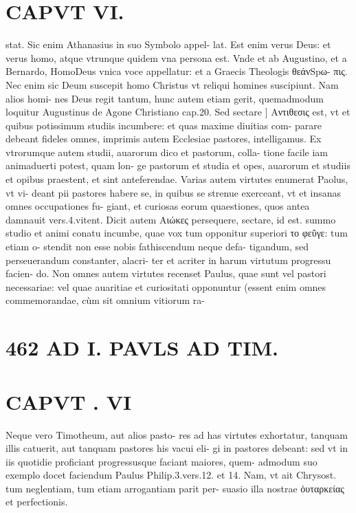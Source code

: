 \documentclass{article}
\begin{document}
\begin{pages}
\section*{CAPVT  VI. }
\marginpar{[ p.461 ]}\pstart stat. Sic enim Athanasius in suo Symbolo appel- lat. Est enim verus Deus: et verus homo, atque vtrunque quidem vna persona est. Vnde et ab Augustino, et a Bernardo, HomoDeus vnica voce appellatur: et a Graecis Theologis θεάνSpω- πις. Nec enim sic Deum suscepit homo Christus vt reliqui homines suscipiunt. Nam alios homi- nes Deus regit tantum, hunc autem etiam gerit, quemadmodum loquitur Augustinus de Agone Christiano cap.20.  \pend\pstart Sed sectare ] Αντιθεσις est, vt et quibus potissimum studiis incumbere: et quas maxime diuitias com- parare debeant fideles omnes, imprimis autem Ecclesiae pastores, intelligamus. Ex vtrorumque autem studii, auarorum dico et pastorum, colla- tione facile iam animaduerti potest, quam lon- ge pastorum et studia et opes, auarorum et studiis et opibus praestent, et sint anteferendae. Varias autem virtutes enumerat Paolus, vt vi- deant pii pastores habere se, in quibus se strenue exerceant, vt et insanas omnes occupationes fu- giant, et curiosas eorum quaestiones, quos antea damnauit vers.4.vitent.  \pend\pstart Dicit autem Αιώκες persequere, sectare, id est. summo studio et animi conatu incumbe, quae vox tum opponitur superiori το φεῦγε: tum etiam o- stendit non esse nobis fathiscendum neque defa- tigandum, sed perseuerandum constanter, alacri- ter et acriter in harum virtutum progressu facien- do. Non omnes autem virtutes recenset Paulus, quae sunt vel pastori necessariae: vel quae auaritiae et curiositati opponuntur (essent enim omnes commemorandae, cùm sit omnium vitiorum ra-  \pend
\section*{462 AD I. PAVLS AD TIM. }
\section*{CAPVT . VI }
\marginpar{[ p.463 ]}\pstart Neque vero Timotheum, aut alios pasto- res ad has virtutes exhortatur, tanquam illis catuerit, aut tanquam pastores his vacui eli- gi in pastores debeant: sed vt in iis quotidie proficiant progressusque faciant maiores, quem- admodum suo exemplo docet faciendum Paulus Philip.3.vers.12. et 14. Nam, vt ait Chrysost. tum neglentiam, tum etiam arrogantiam parit per- suasio illa nostrae ὀυταρκείας et perfectionis.  \pend
{}
{}

\end{pages}
\end{document}
